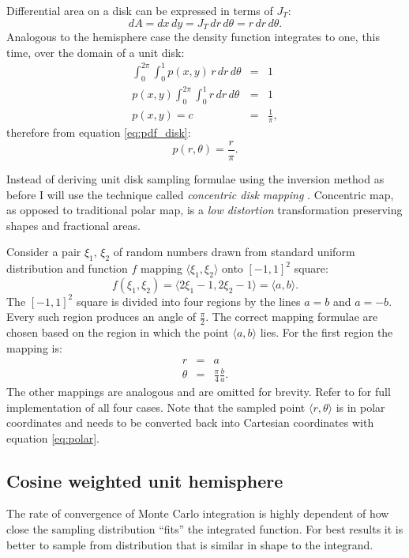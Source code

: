 Differential area on a disk can be expressed in terms of $J_{T}$:
\begin{equation}
  dA = dx\,dy = J_{T}\,dr\,d\theta = r\,dr\,d\theta.
\end{equation}
Analogous to the hemisphere case the density function integrates to one, this time, over the domain of a unit disk:
\begin{eqnarray}
  \int_{0}^{2\pi} \int_{0}^{1} p(x,y) \,r \,dr \,d\theta &=& 1 \nonumber \\
  p(x,y) \int_{0}^{2\pi} \int_{0}^{1} r \,dr \,d\theta &=& 1 \nonumber \\
  p(x,y) = c &=& \frac{1}{\pi},
\end{eqnarray}
therefore from equation \ref{eq:pdf_disk}:
\begin{equation}
  p(r, \theta) = \frac{r}{\pi}.
\end{equation}

Instead of deriving unit disk sampling formulae using the inversion method as before I will use the technique called \emph{concentric disk mapping} \parencite{shirley97}. Concentric map, as opposed to traditional polar map, is a \emph{low distortion} transformation preserving shapes and fractional areas.

Consider a pair $\xi_{1}$, $\xi_{2}$ of random numbers drawn from standard uniform distribution and function $f$ mapping $\langle \xi_{1}, \xi_{2} \rangle$ onto $[-1,1]^{2}$ square:
\begin{equation}
  f(\xi_{1}, \xi_{2}) = \langle 2\xi_{1} - 1, 2\xi_{2} - 1 \rangle = \langle a, b \rangle.
\end{equation}
The $[-1,1]^{2}$ square is divided into four regions by the lines $a=b$ and $a=-b$. Every such region produces an angle of $\frac{\pi}{2}$. The correct mapping formulae are chosen based on the region in which the point $\langle a, b \rangle$ lies. For the first region the mapping is:
\begin{eqnarray}
  r &=& a \nonumber \\
  \theta &=& \frac{\pi}{4} \frac{b}{a}.
\end{eqnarray}
The other mappings are analogous and are omitted for brevity. Refer to \cite{shirley97} for full implementation of all four cases. Note that the sampled point $\langle r, \theta \rangle$ is in polar coordinates and needs to be converted back into Cartesian coordinates with equation \ref{eq:polar}.

\subsection{Cosine weighted unit hemisphere}
The rate of convergence of Monte Carlo integration is highly dependent of how close the sampling distribution ``fits'' the integrated function. For best results it is better to sample from distribution that is similar in shape to the integrand.

